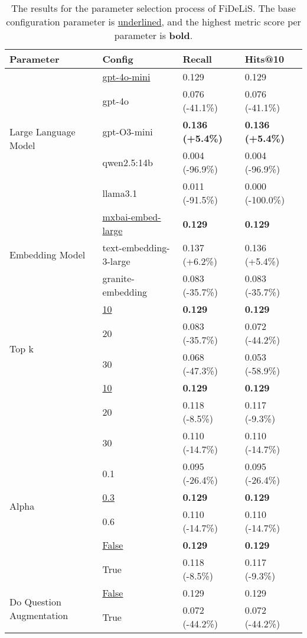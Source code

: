 \begin{table}[t]
    \centering
    \begin{tabular}{llll}
        \toprule
        \textbf{Parameter } & \textbf{Config} & \textbf{Recall} & \textbf{Hits@10} \\
        \midrule
        \multirow{5}{*}{Large Language Model} 
            & \underline{gpt-4o-mini} & 0.129 & 0.129 \\
            & gpt-4o & 0.076 (-41.1\%) & 0.076 (-41.1\%) \\
            & gpt-O3-mini & \textbf{0.136 (+5.4\%)} & \textbf{0.136 (+5.4\%)} \\
            & qwen2.5:14b & 0.004 (-96.9\%) & 0.004 (-96.9\%) \\
            & llama3.1 & 0.011 (-91.5\%) & 0.000 (-100.0\%) \\
        \midrule
        \multirow{3}{*}{Embedding Model} 
            & \underline{mxbai-embed-large} & \textbf{0.129} & \textbf{0.129} \\
            & text-embedding-3-large & 0.137 (+6.2\%) & 0.136 (+5.4\%) \\
            & granite-embedding & 0.083 (-35.7\%) & 0.083 (-35.7\%) \\
        \midrule
        \multirow{4}{*}{Top k}
            & \underline{10} & \textbf{0.129} & \textbf{0.129} \\
            & 20 & 0.083 (-35.7\%) & 0.072 (-44.2\%) \\
            & 30 & 0.068 (-47.3\%) & 0.053 (-58.9\%) \\
        \midrule
        \multirow{4}{*}{Top n}
            & \underline{10} & \textbf{0.129} & \textbf{0.129} \\
            & 20 & 0.118 (-8.5\%) & 0.117 (-9.3\%) \\
            & 30 & 0.110 (-14.7\%) & 0.110 (-14.7\%) \\
        \midrule
        \multirow{4}{*}{Alpha}
            & 0.1 & 0.095 (-26.4\%) & 0.095 (-26.4\%) \\
            & \underline{0.3} & \textbf{0.129} & \textbf{0.129} \\
            & 0.6 & 0.110 (-14.7\%) & 0.110 (-14.7\%) \\
        \midrule
        \multirow{2}{*}{Do Reranking} 
            & \underline{False} & \textbf{0.129} & \textbf{0.129} \\
            & True & 0.118 (-8.5\%) & 0.117 (-9.3\%) \\      
        \midrule
        \multirow{2}{*}{Do Question Augmentation} 
            & \underline{False} & 0.129 & 0.129 \\
            & True & 0.072 (-44.2\%) & 0.072 (-44.2\%) \\
        \bottomrule
    \end{tabular}
    \caption[Results of the Parameter Selection Process for FiDeLiS]{The results for the parameter selection process of FiDeLiS. The base configuration parameter is \underline{underlined}, and the highest metric score per parameter is \textbf{bold}.}
    \label{tab:fidelis_parameter_selection}
\end{table}

